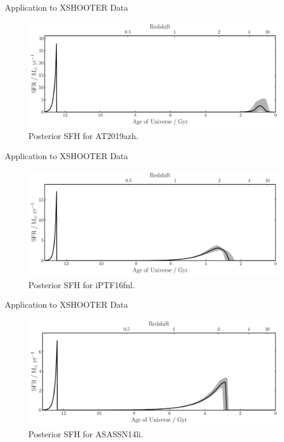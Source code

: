 \documentclass{beamer}
\begin{document}
\begin{frame}{Application to XSHOOTER Data}
  \begin{figure}
    \centering
    \includegraphics[width=\textwidth]{../pipes/plots/r4_dblplaw_burst/AT2019azh_sfh}
    \caption{Posterior SFH for AT2019azh.}
  \end{figure}
\end{frame}

\begin{frame}{Application to XSHOOTER Data}
  \begin{figure}
    \centering
    \includegraphics[width=\textwidth]{../pipes/plots/r4_delayed_burst/iPTF16fnl_sfh}
    \caption{Posterior SFH for iPTF16fnl.}
  \end{figure}
\end{frame}

\begin{frame}{Application to XSHOOTER Data}
  \begin{figure}
    \centering
    \includegraphics[width=\textwidth]{../pipes/plots/r4_exponential_burst/ASASSN14li_sfh}
    \caption{Posterior SFH for ASASSN14li.}
  \end{figure}
\end{frame}
\end{document}
